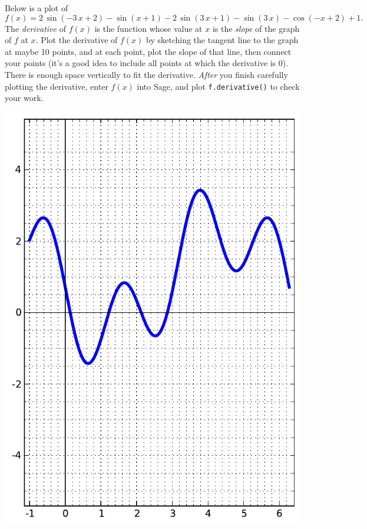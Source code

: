 Below is a plot of $$f(x)=2 \, \sin\left(-3 \, x + 2\right) - \sin\left(x + 1\right) - 2 \, \sin\left(3 \, x + 1\right) - \sin\left(3 \, x\right) - \cos\left(-x + 2\right) + 1.$$  The {\em \color{red}derivative} of $f(x)$ is the function whose value at $x$ is the {\em slope} of the graph of $f$ at $x$.  Plot the derivative of $f(x)$ by sketching the tangent line to the graph at maybe 10 points, and at each point, plot the slope of that line, then connect your points (it's a good idea to include all points at which the derivative is 0).  There is enough space vertically to fit the derivative.  {\em After} you finish carefully plotting the derivative, enter $f(x)$ into Sage, and plot {\color{blue}\verb|f.derivative()|} to check your work.
\begin{center}\includegraphics{functions/23.pdf}\end{center}\newpage

